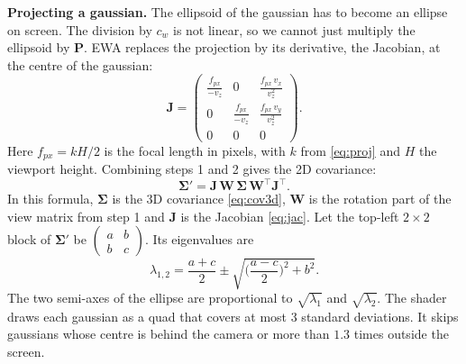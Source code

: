 \documentclass[9pt,twocolumn,a4paper]{extarticle}
\newcommand{\Sig}{\symbf{\Sigma}}
\begin{document}
\textbf{Projecting a gaussian.} The ellipsoid of the gaussian has to become an ellipse on screen. The division by $c_w$ is not linear, so we cannot just multiply the ellipsoid by $\mathbf{P}$. EWA replaces the projection by its derivative, the Jacobian, at the centre of the gaussian:
\begin{equation}
\mathbf{J}=\begin{pmatrix}
\frac{f_{px}}{-v_z}&0&\frac{f_{px}\,v_x}{v_z^{2}}\\[1mm]
0&\frac{f_{px}}{-v_z}&\frac{f_{px}\,v_y}{v_z^{2}}\\[1mm]
0&0&0
\end{pmatrix}.
\label{eq:jac}
\end{equation}
Here $f_{px}=kH/2$ is the focal length in pixels, with $k$ from \eqref{eq:proj} and $H$ the viewport height. Combining steps 1 and 2 gives the 2D covariance:
\begin{equation}
\Sig'=\mathbf{J}\,\mathbf{W}\,\Sig\,\mathbf{W}^{\top}\mathbf{J}^{\top}.
\label{eq:ewa}
\end{equation}
In this formula, $\Sig$ is the 3D covariance \eqref{eq:cov3d}, $\mathbf{W}$ is the rotation part of the view matrix from step 1 and $\mathbf{J}$ is the Jacobian \eqref{eq:jac}. Let the top-left $2\times2$ block of $\Sig'$ be $\begin{pmatrix}a&b\\b&c\end{pmatrix}$. Its eigenvalues are
\begin{equation}
\lambda_{1,2}=\frac{a+c}{2}\pm\sqrt{\Big(\frac{a-c}{2}\Big)^{2}+b^{2}}.
\label{eq:eig}
\end{equation}
The two semi-axes of the ellipse are proportional to $\sqrt{\lambda_1}$ and $\sqrt{\lambda_2}$. The shader draws each gaussian as a quad that covers at most 3 standard deviations. It skips gaussians whose centre is behind the camera or more than $1.3$ times outside the screen.

\par\noindent{}\par\vspace{3pt}

\par\noindent{}\par\vspace{3pt}
\end{document}

